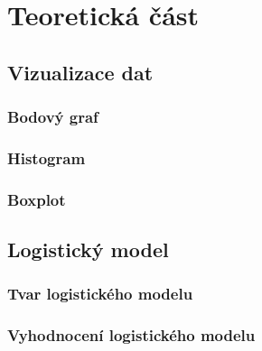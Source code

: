 \chapter{Teoretická část}
\section{Vizualizace dat}
\subsection{Bodový graf}
\subsection{Histogram}
\subsection{Boxplot}
\section{Logistický model}
\subsection{Tvar logistického modelu}
\subsection{Vyhodnocení logistického modelu}